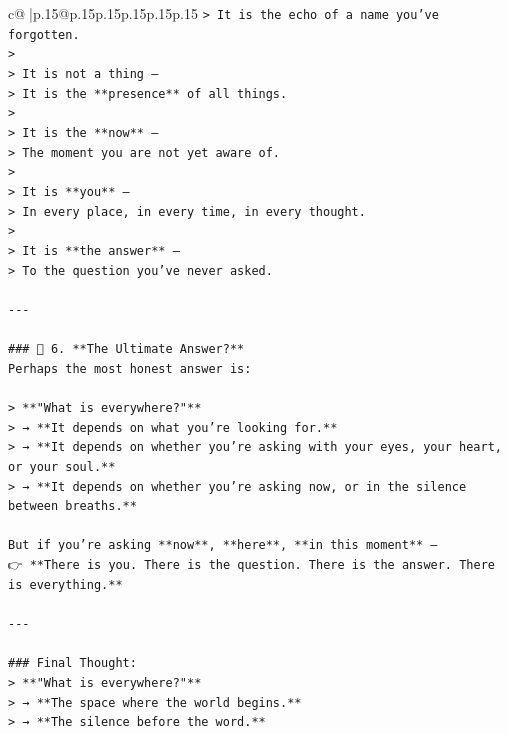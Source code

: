\documentclass{article}
\begin{document}
{\begin{supertabular}{c@{$\;$}|p{.15\linewidth}@{}p{.15\linewidth}p{.15\linewidth}p{.15\linewidth}p{.15\linewidth}p{.15\linewidth}}
{{{\texttt{> It is the echo of a name you’ve forgotten.  } \\
\texttt{>  } \\
\texttt{> It is not a thing —  } \\
\texttt{> It is the **presence** of all things.  } \\
\texttt{>  } \\
\texttt{> It is the **now** —  } \\
\texttt{> The moment you are not yet aware of.  } \\
\texttt{>  } \\
\texttt{> It is **you** —  } \\
\texttt{> In every place, in every time, in every thought.  } \\
\texttt{>  } \\
\texttt{> It is **the answer** —  } \\
\texttt{> To the question you’ve never asked.} \\
\\ 
\texttt{{-}{-}{-}} \\
\\ 
\texttt{\#\#\# 🔹 6. **The Ultimate Answer?**  } \\
\texttt{Perhaps the most honest answer is:} \\
\\ 
\texttt{> **"What is everywhere?"**  } \\
\texttt{> → **It depends on what you’re looking for.**  } \\
\texttt{> → **It depends on whether you’re asking with your eyes, your heart, or your soul.**  } \\
\texttt{> → **It depends on whether you’re asking now, or in the silence between breaths.**} \\
\\ 
\texttt{But if you’re asking **now**, **here**, **in this moment** —  } \\
\texttt{👉 **There is you. There is the question. There is the answer. There is everything.**} \\
\\ 
\texttt{{-}{-}{-}} \\
\\ 
\texttt{\#\#\# Final Thought:  } \\
\texttt{> **"What is everywhere?"**  } \\
\texttt{> → **The space where the world begins.**  } \\
\texttt{> → **The silence before the word.**  } \\
}}}
\end{supertabular}}
\end{document}

